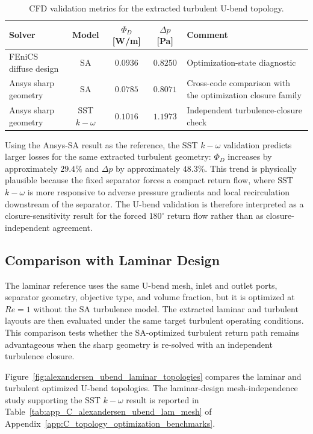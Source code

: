 \begin{table}[!ht]
	\centering
	\footnotesize
	\caption{CFD validation metrics for the extracted turbulent U-bend topology.}
	\label{tab:alexandersen_ubend_validation_metrics}
	\renewcommand{\arraystretch}{1.2}
	\begin{tabularx}{\textwidth}{l c c c X}
		\hline
		\textbf{Solver} & \textbf{Model} & \textbf{$\Phi_D$ [W/m]} & \textbf{$\Delta p$ [Pa]} & \textbf{Comment} \\
		\hline
		FEniCS diffuse design & SA & $0.0936$ & $0.8250$ & Optimization-state diagnostic \\
		Ansys sharp geometry & SA & $0.0785$ & $0.8071$ & Cross-code comparison with the optimization closure family \\
		Ansys sharp geometry & SST $k-\omega$ & $0.1016$ & $1.1973$ & Independent turbulence-closure check \\
		\hline
	\end{tabularx}
\end{table}

Using the Ansys-SA result as the reference, the SST $k-\omega$ validation predicts larger losses for the same extracted turbulent geometry: $\Phi_D$ increases by approximately $29.4\%$ and $\Delta p$ by approximately $48.3\%$. This trend is physically plausible because the fixed separator forces a compact return flow, where SST $k-\omega$ is more responsive to adverse pressure gradients and local recirculation downstream of the separator. The U-bend validation is therefore interpreted as a closure-sensitivity result for the forced $180^\circ$ return flow rather than as closure-independent agreement.

\subsection{Comparison with Laminar Design}
\label{subsec:alexandersen_ubend_laminar}
The laminar reference uses the same U-bend mesh, inlet and outlet ports, separator geometry, objective type, and volume fraction, but it is optimized at $Re=1$ without the SA turbulence model. The extracted laminar and turbulent layouts are then evaluated under the same target turbulent operating conditions. This comparison tests whether the SA-optimized turbulent return path remains advantageous when the sharp geometry is re-solved with an independent turbulence closure.

Figure~\ref{fig:alexandersen_ubend_laminar_topologies} compares the laminar and turbulent optimized U-bend topologies. The laminar-design mesh-independence study supporting the SST $k-\omega$ result is reported in Table~\ref{tab:app_C_alexandersen_ubend_lam_mesh} of Appendix~\ref{app:C_topology_optimization_benchmarks}.

